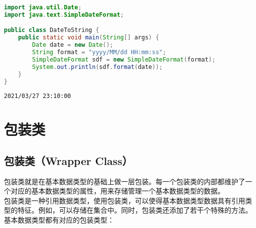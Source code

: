 
\begin{lstlisting}[language=Java]
import java.util.Date;
import java.text.SimpleDateFormat;

public class DateToString {
    public static void main(String[] args) {
        Date date = new Date();
        String format = "yyyy/MM/dd HH:mm:ss";
        SimpleDateFormat sdf = new SimpleDateFormat(format);
        System.out.println(sdf.format(date));
    }
}
\end{lstlisting}

\begin{tcolorbox}
	\begin{verbatim}
2021/03/27 23:10:00
	\end{verbatim}
\end{tcolorbox}

\newpage

\section{包装类}

\subsection{包装类（Wrapper Class）}

包装类就是在基本数据类型的基础上做一层包装。每一个包装类的内部都维护了一个对应的基本数据类型的属性，用来存储管理一个基本数据类型的数据。\\

包装类是一种引用数据类型，使用包装类，可以使得基本数据类型数据具有引用类型的特征。例如，可以存储在集合中。同时，包装类还添加了若干个特殊的方法。\\

基本数据类型都有对应的包装类型：

\begin{table}[H]
	\centering
	\caption{包装类}
\end{table}

